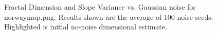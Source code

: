 \documentclass[12pt, oneside]{book}
\begin{document}
\begin{figure}[!b]
  \centering
  \caption[Fractal Dimension and Slope Variance vs. Gaussian noise for norwaymap.png.]{Fractal Dimension and Slope Variance vs. Gaussian noise for norwaymap.png.  Results shown are the average of 100 noise seeds.  Highlighted is initial no-noise dimensional estimate.}
  \label{fig:norwaymap_gaussian_result}
\end{figure}
\end{document}
